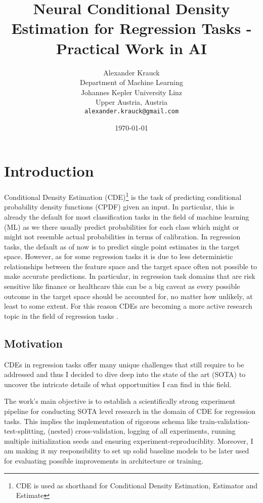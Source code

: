 \documentclass{article}
\title{Neural Conditional Density Estimation for Regression Tasks - Practical Work in AI}
\author{%
  Alexander Krauck \\
  Department of Machine Learning\\
  Johannes Kepler University Linz\\
  Upper Austria, Austria \\
  \texttt{alexander.krauck@gmail.com}
}
\date{\specialdate\today}
\begin{document}
\maketitle

\section{Introduction}
Conditional Density Estimation (CDE)\footnote{CDE is used as shorthand for Conditional Density Estimation, Estimator and Estimate} is the task of predicting conditional probability density functions (CPDF) given an input. In particular, this is already the default for most classification tasks in the field of machine learning (ML) as we there usually predict probabilities for each class which might or might not resemble actual probabilities in terms of calibration. In regression tasks, the default as of now is to predict single point estimates in the target space. However, as for some regression tasks it is due to less deterministic relationships between the feature space and the target space often not possible to make accurate predictions. In particular, in regression task domains that are risk sensitive like finance or healthcare this can be a big caveat as every possible outcome in the target space should be accounted for, no matter how unlikely, at least to some extent. For this reason CDEs are becoming a more active research topic in the field of regression tasks \citep{rothfuss2019noise, rothfuss2019conditional, klotz2021uncertainty, trippe2018conditional, rezende2015variational}.

\subsection{Motivation}
CDEs in regression tasks offer many unique challenges that still require to be addressed and thus I decided to dive deep into the state of the art (SOTA) to uncover the intricate details of what opportunities I can find in this field.

The work's main objective is to establish a scientifically strong experiment pipeline for conducting SOTA level research in the domain of CDE for regression tasks. This implies the implementation of rigorous schema like train-validation-test-splitting, (nested) cross-validation, logging of all experiments, running multiple initialization seeds and ensuring experiment-reproduciblity. Moreover, I am making it my responsibility to set up solid baseline models to be later used for evaluating possible improvements in architecture or training.
\end{document}
